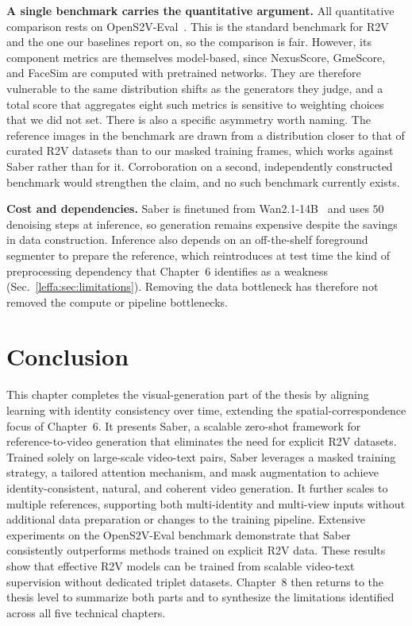 \noindent \textbf{A single benchmark carries the quantitative argument.}
All quantitative comparison rests on OpenS2V-Eval~\citep{yuan2025opens2v}. This is the standard benchmark for R2V and the one our baselines report on, so the comparison is fair. However, its component metrics are themselves model-based, since NexusScore, GmeScore, and FaceSim are computed with pretrained networks. They are therefore vulnerable to the same distribution shifts as the generators they judge, and a total score that aggregates eight such metrics is sensitive to weighting choices that we did not set. There is also a specific asymmetry worth naming. The reference images in the benchmark are drawn from a distribution closer to that of curated R2V datasets than to our masked training frames, which works against Saber rather than for it. Corroboration on a second, independently constructed benchmark would strengthen the claim, and no such benchmark currently exists.

\noindent \textbf{Cost and dependencies.}
Saber is finetuned from Wan2.1-14B~\citep{wan2025wan} and uses $50$ denoising steps at inference, so generation remains expensive despite the savings in data construction. Inference also depends on an off-the-shelf foreground segmenter to prepare the reference, which reintroduces at test time the kind of preprocessing dependency that Chapter~6 identifies as a weakness (Sec.~\ref{leffa:sec:limitations}). Removing the data bottleneck has therefore not removed the compute or pipeline bottlenecks.

\section{Conclusion}
\label{saber:sec:conclusion}

This chapter completes the visual-generation part of the thesis by aligning learning with identity consistency over time, extending the spatial-correspondence focus of Chapter~6.
It presents Saber, a scalable zero-shot framework for reference-to-video generation that eliminates the need for explicit R2V datasets.
Trained solely on large-scale video-text pairs, Saber leverages a masked training strategy, a tailored attention mechanism, and mask augmentation to achieve identity-consistent, natural, and coherent video generation.
It further scales to multiple references, supporting both multi-identity and multi-view inputs without additional data preparation or changes to the training pipeline.
Extensive experiments on the OpenS2V-Eval benchmark demonstrate that Saber consistently outperforms methods trained on explicit R2V data.
These results show that effective R2V models can be trained from scalable video-text supervision without dedicated triplet datasets.
Chapter~8 then returns to the thesis level to summarize both parts and to synthesize the limitations identified across all five technical chapters.
